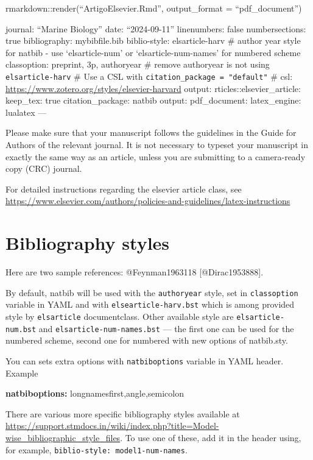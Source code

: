 \documentclass[
]{article}
\newenvironment{Shaded}{\begin{snugshade}}{\end{snugshade}}
\newcommand{\AttributeTok}[1]{\textcolor[rgb]{0.13,0.29,0.53}{#1}}
\newcommand{\FunctionTok}[1]{\textcolor[rgb]{0.13,0.29,0.53}{\textbf{#1}}}
\newcommand{\KeywordTok}[1]{\textcolor[rgb]{0.13,0.29,0.53}{\textbf{#1}}}
\begin{document}
rmarkdown::render(``ArtigoElsevier.Rmd'', output\_format =
``pdf\_document'')

journal: ``Marine Biology'' date: ``2024-09-11'' linenumbers: false
numbersections: true bibliography: mybibfile.bib biblio-style:
elsarticle-harv \# author year style for natbib - use `elsarticle-num'
or `elsarticle-num-names' for numbered scheme classoption: preprint, 3p,
authoryear \# remove authoryear is not using \texttt{elsarticle-harv} \#
Use a CSL with \texttt{citation\_package\ =\ "default"} \# csl:
\url{https://www.zotero.org/styles/elsevier-harvard} output:
rticles::elsevier\_article: keep\_tex: true citation\_package: natbib
output: pdf\_document: latex\_engine: lualatex ---

Please make sure that your manuscript follows the guidelines in the
Guide for Authors of the relevant journal. It is not necessary to
typeset your manuscript in exactly the same way as an article, unless
you are submitting to a camera-ready copy (CRC) journal.

For detailed instructions regarding the elsevier article class, see
\url{https://www.elsevier.com/authors/policies-and-guidelines/latex-instructions}

\section{Bibliography styles}\label{bibliography-styles}

Here are two sample references: @Feynman1963118 {[}@Dirac1953888{]}.

By default, natbib will be used with the \texttt{authoryear} style, set
in \texttt{classoption} variable in YAML and with
\texttt{elsearticle-harv.bst} which is among provided style by
\texttt{elsarticle} documentclass. Other available style are
\texttt{elsarticle-num.bst} and \texttt{elsarticle-num-names.bst} ---
the first one can be used for the numbered scheme, second one for
numbered with new options of natbib.sty.

You can sets extra options with \texttt{natbiboptions} variable in YAML
header. Example

\begin{Shaded}
\begin{Highlighting}[]
\FunctionTok{natbiboptions}\KeywordTok{:}\AttributeTok{ longnamesfirst,angle,semicolon}
\end{Highlighting}
\end{Shaded}

There are various more specific bibliography styles available at
\url{https://support.stmdocs.in/wiki/index.php?title=Model-wise_bibliographic_style_files}.
To use one of these, add it in the header using, for example,
\texttt{biblio-style:\ model1-num-names}.
\end{document}
